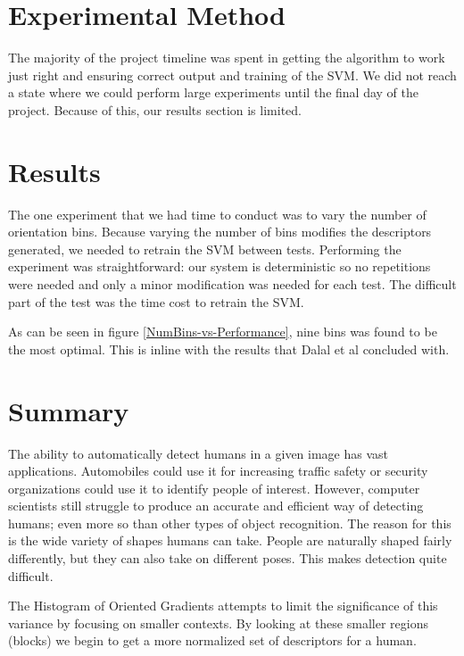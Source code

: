 \documentclass[a4paper,11pt]{article}
\begin{document}
\begin{multicols}{2}

\section{Experimental Method}
The majority of the project timeline was spent in getting the algorithm to 
work just right and ensuring correct output and training of the SVM. We did 
not reach a state where we could perform large experiments until the final 
day of the project. Because of this, our results section is limited.

\section{Results}
The one experiment that we had time to conduct was to vary the number of orientation bins.
Because varying the number of bins modifies the descriptors generated, we needed to 
retrain the SVM between tests.  Performing the experiment was straightforward:  our 
system is deterministic so no repetitions were needed and only a minor modification 
was needed for each test.  The difficult part of the test was the time cost to retrain the SVM.

As can be seen in figure \ref{NumBins-vs-Performance}, nine bins was found to be the most optimal. This is inline with 
the results that Dalal et al concluded with.

\section{Summary}
The ability to automatically detect humans in a given image has vast applications. Automobiles could use 
it for increasing traffic safety or security organizations could use it to identify people of interest.
However, computer scientists still struggle to produce an accurate and efficient way of detecting humans; even
more so than other types of object recognition. The reason for this is the wide variety of shapes humans can take. 
People are naturally shaped fairly differently, but they can also take on different poses. This makes detection 
quite difficult.

The Histogram of Oriented Gradients attempts to limit the significance of this variance by focusing on smaller 
contexts. By looking at these smaller regions (blocks) we begin to get a more normalized set of descriptors for a human.


\end{multicols}
\end{document}
